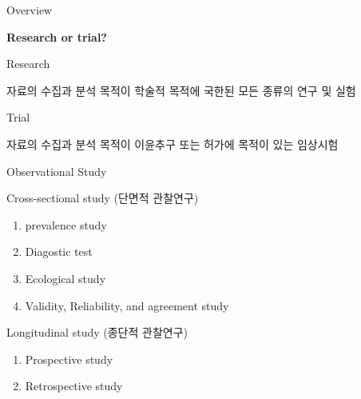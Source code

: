 \documentclass[9pt,ignorenonframetext,xcolor=dvipsnames]{beamer}
\providecommand{\tightlist}{%
  \setlength{\itemsep}{0pt}\setlength{\parskip}{0pt}}
\newlength{\wideitemsep}
\let\olditem\item
\renewcommand{\item}{\setlength{\itemsep}{\wideitemsep}\olditem}
\begin{document}
\begin{frame}{Overview}

\LARGE{\textbf{Research or trial?}}

\begin{block}{Research}

\normalsize{자료의 수집과 분석 목적이 학술적 목적에 국한된 모든 종류의 연구 및 실험}

\end{block}

\begin{block}{Trial}

\normalsize{자료의 수집과 분석 목적이 이윤추구 또는 허가에 목적이 있는 임상시험}

\end{block}

\end{frame}

\begin{frame}{Observational Study}

\begin{block}{Cross-sectional study (단면적 관찰연구)}

\begin{enumerate}
\def\labelenumi{\arabic{enumi}.}
\tightlist
\item
  prevalence study
\item
  Diagostic test
\item
  Ecological study
\item
  Validity, Reliability, and agreement study
\end{enumerate}

\end{block}

\begin{block}{Longitudinal study (종단적 관찰연구)}

\begin{enumerate}
\def\labelenumi{\arabic{enumi}.}
\tightlist
\item
  Prospective study
\item
  Retrospective study
\end{enumerate}

\end{block}

\end{frame}
\end{document}
